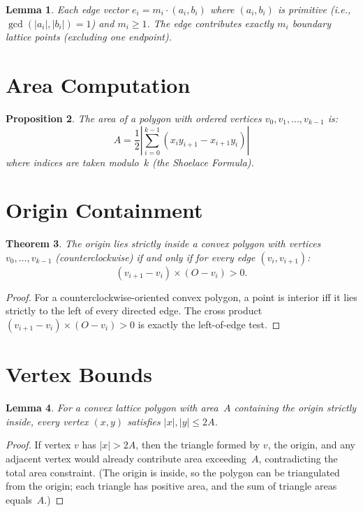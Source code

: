 \documentclass[11pt]{article}
\newtheorem{theorem}{Theorem}
\newtheorem{lemma}[theorem]{Lemma}
\newtheorem{proposition}[theorem]{Proposition}
\theoremstyle{definition}
\begin{document}
\begin{lemma}
Each edge vector $e_i = m_i \cdot (a_i, b_i)$ where $(a_i, b_i)$ is primitive (i.e., $\gcd(|a_i|, |b_i|) = 1$) and $m_i \geq 1$. The edge contributes exactly $m_i$ boundary lattice points (excluding one endpoint).
\end{lemma}

\section{Area Computation}

\begin{proposition}
The area of a polygon with ordered vertices $v_0, v_1, \ldots, v_{k-1}$ is:
\[
A = \frac{1}{2}\left|\sum_{i=0}^{k-1}(x_i y_{i+1} - x_{i+1} y_i)\right|
\]
where indices are taken modulo~$k$ (the Shoelace Formula).
\end{proposition}

\section{Origin Containment}

\begin{theorem}
The origin lies strictly inside a convex polygon with vertices $v_0, \ldots, v_{k-1}$ (counterclockwise) if and only if for every edge $(v_i, v_{i+1})$:
\[
(v_{i+1} - v_i) \times (O - v_i) > 0.
\]
\end{theorem}

\begin{proof}
For a counterclockwise-oriented convex polygon, a point is interior iff it lies strictly to the left of every directed edge. The cross product $(v_{i+1} - v_i) \times (O - v_i) > 0$ is exactly the left-of-edge test.
\end{proof}

\section{Vertex Bounds}

\begin{lemma}
For a convex lattice polygon with area~$A$ containing the origin strictly inside, every vertex $(x, y)$ satisfies $|x|, |y| \leq 2A$.
\end{lemma}

\begin{proof}
If vertex $v$ has $|x| > 2A$, then the triangle formed by $v$, the origin, and any adjacent vertex would already contribute area exceeding~$A$, contradicting the total area constraint. (The origin is inside, so the polygon can be triangulated from the origin; each triangle has positive area, and the sum of triangle areas equals~$A$.)
\end{proof}
\end{document}
